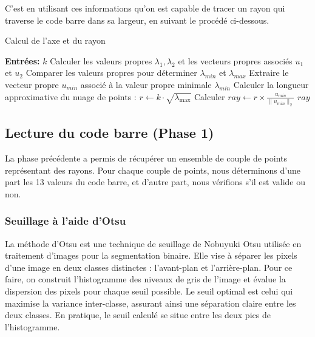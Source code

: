 \documentclass{rapport}
\begin{document}
C'est en utilisant ces informations qu'on est capable de tracer un rayon qui traverse le code barre dans sa largeur, en suivant le procédé ci-dessous.
\begin{algorithm}
\caption{Calcul de l'axe et du rayon}
\begin{algorithmic}[1]
    \State \textbf{Entrées:} $k$ 
    \State Calculer les valeurs propres $\lambda_1, \lambda_2$ et les vecteurs propres associés $u_1$ et $u_2$
    \State Comparer les valeurs propres pour déterminer $\lambda_{min}$ et $\lambda_{max}$
    \State Extraire le vecteur propre $u_{min}$ associé à la valeur propre minimale $\lambda_{min}$
    \State Calculer la longueur approximative du nuage de points : $r \gets k \cdot \sqrt{\lambda_{{\text{max}}}}$
    \State Calculer $ray \gets r \times \frac{u_{min}}{\| u_{min}\|_2}$
    \State \Return $ray$
\EndProcedure
\end{algorithmic}
\end{algorithm}

\newpage
\subsection{Lecture du code barre (Phase 1)}

La phase précédente a permis de récupérer un ensemble de couple de points représentant des rayons. 
Pour chaque couple de points, nous déterminons d'une part les 13 valeurs du code barre, et d'autre part, nous vérifions s'il est valide ou non.

\subsubsection*{Seuillage à l'aide d'Otsu}
La méthode d'Otsu est une technique de seuillage de Nobuyuki Otsu utilisée en traitement d'images pour la segmentation binaire. 
Elle vise à séparer les pixels d'une image en deux classes distinctes : l'avant-plan et l'arrière-plan. 
Pour ce faire, on construit l'histogramme des niveaux de gris de l'image et évalue la dispersion des pixels pour chaque seuil possible. 
Le seuil optimal est celui qui maximise la variance inter-classe, assurant ainsi une séparation claire entre les deux classes. 
En pratique, le seuil calculé se situe entre les deux pics de l'histogramme.
\end{document}
